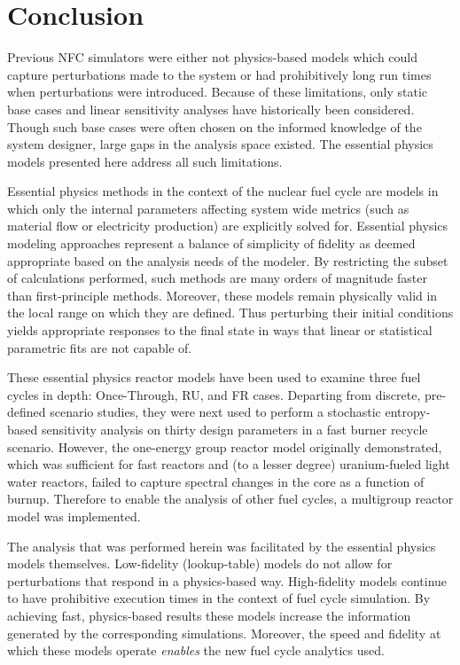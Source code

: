 \chapter{Conclusion}
\label{diss_conclusion}
Previous NFC simulators were either not physics-based models which could capture perturbations made to the system
or had prohibitively long run times when perturbations were introduced.  Because of these 
limitations, only static base cases and linear sensitivity analyses have historically been considered.  
Though such base cases were often chosen on the informed knowledge of the system designer, 
large gaps in the analysis space existed.  The essential physics models presented here address all such 
limitations.

Essential physics methods in the context of the nuclear fuel cycle are models 
in which only the internal parameters affecting system wide metrics (such as material flow
or electricity production) are explicitly solved for.  
Essential physics modeling approaches represent a balance of simplicity of fidelity as deemed 
appropriate based on the analysis needs of the modeler.
By restricting the subset of 
calculations performed, such methods are many orders of magnitude faster than first-principle 
methods.  Moreover, these models remain physically valid in the local range on which they are defined.
Thus perturbing their initial conditions yields appropriate responses to the final state
in ways that linear or statistical parametric fits are not capable of.

These essential physics reactor models have been used to examine three fuel cycles 
in depth: Once-Through, RU, and FR cases.  
Departing from discrete, pre-defined scenario studies, they were next used to perform 
a stochastic entropy-based sensitivity analysis on thirty design parameters in a fast
burner recycle scenario.  However, the one-energy group reactor model originally demonstrated, 
which was sufficient for fast reactors and (to a lesser degree) uranium-fueled light 
water reactors,  failed to capture 
spectral changes in the core as a function of burnup.
Therefore to enable the analysis of other fuel cycles, a multigroup reactor model was implemented.  

The analysis that was performed herein was facilitated by the essential physics models themselves.
Low-fidelity (lookup-table) models do not allow for perturbations that respond 
in a physics-based way.  High-fidelity models continue to have prohibitive execution times in the 
context of fuel cycle simulation.  By achieving fast, physics-based results these models increase 
the information generated by the corresponding simulations.
Moreover, the speed and fidelity at which these models operate \emph{enables} the 
new fuel cycle analytics used.  

